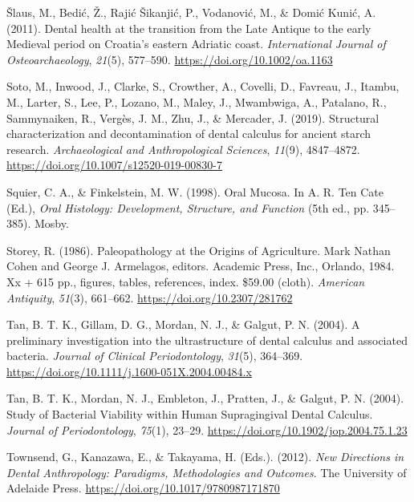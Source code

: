 \documentclass[
  letterpaper,
]{book}
\newlength{\cslhangindent}
\newlength{\cslentryspacingunit} %
\newenvironment{CSLReferences}[2] %
 {%
  \setlength{\parindent}{0pt}
  \ifodd #1
  \let\oldpar\par
  \def\par{\hangindent=\cslhangindent\oldpar}
  \fi
  \setlength{\parskip}{#2\cslentryspacingunit}
 }%
 {}
\begin{document}
\begin{CSLReferences}{1}{0}
\leavevmode{}%
Šlaus, M., Bedić, Ž., Rajić Šikanjić, P., Vodanović, M., \& Domić Kunić,
A. (2011). Dental health at the transition from the {Late Antique} to
the early {Medieval} period on {Croatia}'s eastern {Adriatic} coast.
\emph{International Journal of Osteoarchaeology}, \emph{21}(5),
577--590. \url{https://doi.org/10.1002/oa.1163}

\leavevmode{}%
Soto, M., Inwood, J., Clarke, S., Crowther, A., Covelli, D., Favreau,
J., Itambu, M., Larter, S., Lee, P., Lozano, M., Maley, J., Mwambwiga,
A., Patalano, R., Sammynaiken, R., Vergès, J. M., Zhu, J., \& Mercader,
J. (2019). Structural characterization and decontamination of dental
calculus for ancient starch research. \emph{Archaeological and
Anthropological Sciences}, \emph{11}(9), 4847--4872.
\url{https://doi.org/10.1007/s12520-019-00830-7}

\leavevmode{}%
Squier, C. A., \& Finkelstein, M. W. (1998). Oral {Mucosa}. In A. R. Ten
Cate (Ed.), \emph{Oral {Histology}: {Development}, {Structure}, and
{Function}} (5th ed., pp. 345--385). {Mosby}.

\leavevmode{}%
Storey, R. (1986). Paleopathology at the {Origins} of {Agriculture}.
{Mark Nathan Cohen} and {George J}. {Armelagos}, editors. {Academic
Press}, {Inc}., {Orlando}, 1984. Xx + 615 pp., figures, tables,
references, index. \$59.00 (cloth). \emph{American Antiquity},
\emph{51}(3), 661--662. \url{https://doi.org/10.2307/281762}

\leavevmode{}%
Tan, B. T. K., Gillam, D. G., Mordan, N. J., \& Galgut, P. N. (2004). A
preliminary investigation into the ultrastructure of dental calculus and
associated bacteria. \emph{Journal of Clinical Periodontology},
\emph{31}(5), 364--369.
\url{https://doi.org/10.1111/j.1600-051X.2004.00484.x}

\leavevmode{}%
Tan, B. T. K., Mordan, N. J., Embleton, J., Pratten, J., \& Galgut, P.
N. (2004). Study of {Bacterial Viability} within {Human Supragingival
Dental Calculus}. \emph{Journal of Periodontology}, \emph{75}(1),
23--29. \url{https://doi.org/10.1902/jop.2004.75.1.23}

\leavevmode{}%
Townsend, G., Kanazawa, E., \& Takayama, H. (Eds.). (2012). \emph{New
{Directions} in {Dental Anthropology}: {Paradigms}, {Methodologies} and
{Outcomes}}. {The University of Adelaide Press}.
\url{https://doi.org/10.1017/9780987171870}


\end{CSLReferences}
\end{document}

